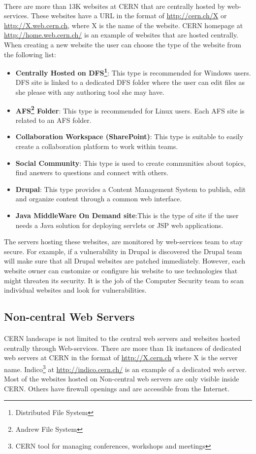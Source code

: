 \paragraph{}
There are more than 13K websites at CERN that are centrally hosted by web-services. These websites have a URL in the format of \url{http://cern.ch/X} or \url{http://X.web.cern.ch}, where X is the name of the website. CERN homepage at \url{http://home.web.cern.ch/} is an example of websites that are hosted centrally. When creating a new website the user can choose the type of the website from the following list:
\begin{itemize}
\item \textbf{Centrally Hosted on DFS\footnote{Distributed File System}}: This type is recommended for Windows users. DFS site is linked to a dedicated DFS folder where the user can edit files as she please with any authoring tool she may have.
\item \textbf{AFS\footnote{Andrew File System} Folder}: This type is recommended for Linux users. Each AFS site is related to an AFS folder.
\item \textbf{Collaboration Workspace (SharePoint)}: This type is suitable to easily create a collaboration platform to work within teams.
\item \textbf{Social Community}: This type is used to create communities about topics, find answers to questions and connect with others.
\item \textbf{Drupal}: This type provides a Content Management System to publish, edit and organize content through a common web interface.
\item \textbf{Java MiddleWare On Demand site}:This is the type of site if the user needs a Java solution for deploying servlets or JSP web applications.
\end{itemize}
The servers hosting these websites, are monitored by web-services team to stay secure. For example, if a vulnerability in Drupal is discovered the Drupal team will make sure that all Drupal websites are patched immediately. However, each website owner can customize or configure his website to use technologies that might threaten its security. It is the job of the Computer Security team to scan individual websites and look for vulnerabilities. 
\subsection{Non-central Web Servers}
\paragraph{}
CERN landscape is not limited to the central web servers and websites hosted centrally through Web-services. There are more than 1k instances of dedicated web servers at CERN in the format of \url{http://X.cern.ch} where X is the server name. Indico\footnote{CERN tool for managing conferences, workshops and meetings} at \url{http://indico.cern.ch/} is an example of a dedicated web server. Most of the websites hosted on Non-central web servers are only visible inside CERN. Others have firewall openings and are accessible from the Internet.

